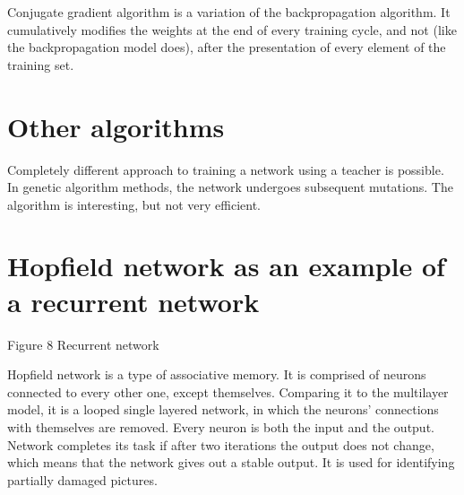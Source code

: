 \documentclass[10pt,oneside]{memoir}
\begin{document}
Conjugate gradient algorithm is a variation of the backpropagation algorithm. It cumulatively modifies the weights at the end of every training cycle, and not (like the backpropagation model does), after the presentation of every element of the training set.


\section{Other algorithms}
\label{otheralgorithms}

Completely different approach to training a network using a teacher is possible. In genetic algorithm methods, the network undergoes subsequent mutations. The algorithm is interesting, but not very efficient.


\section{Hopfield network as an example of a recurrent network}
\label{hopfieldnetworkasanexampleofarecurrentnetwork}

\begin{figure}
\begin{center}
\end{center}
\label{figure8}
\end{figure}

Figure 8 Recurrent network


Hopfield network is a type of associative memory. It is comprised of neurons connected to every other one, except themselves. Comparing it to the multilayer model, it is a looped single layered network, in which the neurons' connections with themselves are removed. Every neuron is both the input and the output. Network completes its task if after two iterations the output does not change, which means that the network gives out a stable output. It is used for identifying partially damaged pictures.
\end{document}
